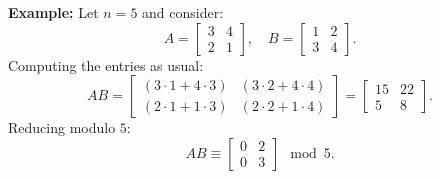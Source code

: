 \noindent \textbf{Example:} Let \( n = 5 \) and consider:
\[
A = \begin{bmatrix} 3 & 4 \\ 2 & 1 \end{bmatrix}, \quad
B = \begin{bmatrix} 1 & 2 \\ 3 & 4 \end{bmatrix}.
\]
Computing the entries as usual:
\[
AB = \begin{bmatrix} 
(3\cdot1 + 4\cdot3) & (3\cdot2 + 4\cdot4) \\ 
(2\cdot1 + 1\cdot3) & (2\cdot2 + 1\cdot4) 
\end{bmatrix} 
= \begin{bmatrix} 15 & 22 \\ 5 & 8 \end{bmatrix}.
\]
Reducing modulo \( 5 \):
\[
AB \equiv \begin{bmatrix} 0 & 2 \\ 0 & 3 \end{bmatrix} \mod 5.
\]